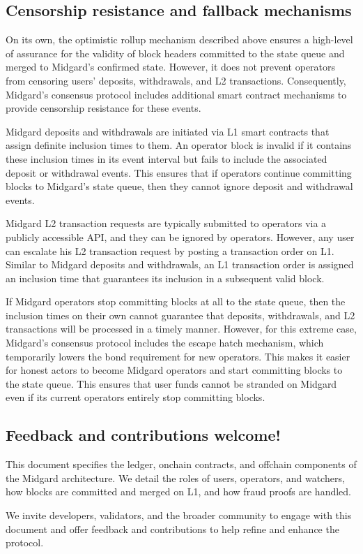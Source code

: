 \documentclass[../midgard.tex]{subfiles}
\begin{document}
\subsection*{Censorship resistance and fallback mechanisms}

On its own, the optimistic rollup mechanism described above ensures a high-level of assurance for the validity of block headers committed to the state queue and merged to Midgard's confirmed state.
However, it does not prevent operators from censoring users' deposits, withdrawals, and L2 transactions.
Consequently, Midgard's consensus protocol includes additional smart contract mechanisms to provide censorship resistance for these events.

Midgard deposits and withdrawals are initiated via L1 smart contracts that assign definite inclusion times to them.
An operator block is invalid if it contains these inclusion times in its event interval but fails to include the associated deposit or withdrawal events.
This ensures that if operators continue committing blocks to Midgard's state queue, then they cannot ignore deposit and withdrawal events.

Midgard L2 transaction requests are typically submitted to operators via a publicly accessible API, and they can be ignored by operators.
However, any user can escalate his L2 transaction request by posting a transaction order on L1.
Similar to Midgard deposits and withdrawals, an L1 transaction order is assigned an inclusion time that guarantees its inclusion in a subsequent valid block.

If Midgard operators stop committing blocks at all to the state queue, then the inclusion times on their own cannot guarantee that deposits, withdrawals, and L2 transactions will be processed in a timely manner.
However, for this extreme case, Midgard's consensus protocol includes the escape hatch mechanism, which temporarily lowers the bond requirement for new operators.
This makes it easier for honest actors to become Midgard operators and start committing blocks to the state queue.
This ensures that user funds cannot be stranded on Midgard even if its current operators entirely stop committing blocks.

\subsection*{Feedback and contributions welcome!}
\label{h:feedback-and-contributions-welcome}

This document specifies the ledger, onchain contracts, and offchain components of the Midgard architecture.
We detail the roles of users, operators, and watchers, how blocks are committed and merged on L1, and how fraud proofs are handled.

We invite developers, validators, and the broader community to engage with this document and offer feedback and contributions to help refine and enhance the protocol.
\end{document}
